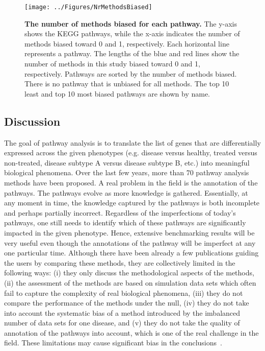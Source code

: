 \documentclass[Minh_PhD_thesis.tex]{subfiles}
\begin{document}
\begin{figure}[h]
	\texttt{[image: ../Figures/NrMethodsBiased]}

        \caption{\textbf{The number of methods biased for each pathway.} The y-axis shows the KEGG pathways, while the x-axis indicates the number of methods biased toward 0 and  1, respectively. Each horizontal line represents a pathway. The lengths of the blue and red lines show the number of methods in this study biased toward 0 and 1, respectively. Pathways are sorted by the number of methods biased. There is no pathway that is unbiased for all methods. The top 10 least and top 10 most biased pathways are shown by name.}\label{fig:PathwaysDist}
\end{figure}

\subsection{Discussion}
The goal of pathway analysis is to translate the list of genes that are differentially expressed across the given phenotypes (e.g. disease versus healthy, treated versus non-treated, disease subtype A versus disease subtype B, etc.) into meaningful biological phenomena.
Over the last few years, more than 70 pathway analysis methods have been proposed.
A real problem in the field is the annotation of the pathways. The pathways evolve as more knowledge is gathered. Essentially, at any moment in time, the knowledge captured by the pathways is both incomplete and perhaps partially incorrect. Regardless of the imperfections of today's pathways, one still needs to identify which of these pathways  are significantly impacted in the given phenotype. Hence, extensive benchmarking results will be very useful even though the annotations of the pathway will be imperfect at any one particular time. 
Although there have been already a few publications guiding the users by comparing these methods, they are collectively limited in the following ways: (i) they only discuss the methodological aspects of the methods, (ii) the assessment of the methods are based on simulation data sets which often fail to capture the complexity of real biological phenomena, (iii) they do not compare the performance of the methods under the null, (iv) they do not take into account the systematic bias of a method introduced by the imbalanced number of data sets for one disease, and (v) they do not take the quality of annotation of the pathways into account, which is one of the real challenge in the field.
These limitations may cause significant bias in the conclusions~\cite{nguyen2018network}.
\end{document}
